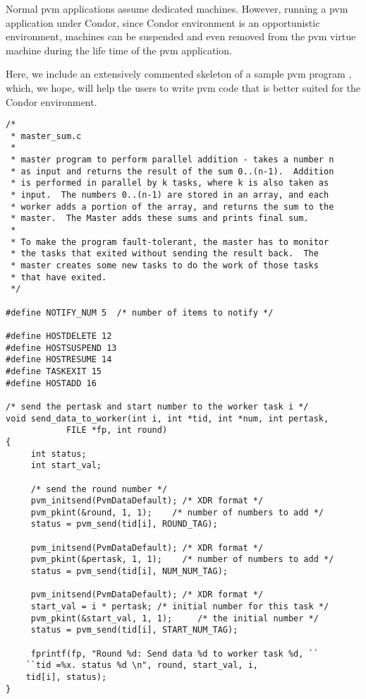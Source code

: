Normal pvm applications assume dedicated machines.  However, running a
pvm application under Condor, since Condor environment is an
opportunistic environment, machines can be suspended and even removed
from the pvm virtue machine during the life time of the pvm
application.  

Here, we include an extensively commented skeleton of a sample pvm
program , which, we hope, will help the users to
write pvm code that is better suited for the Condor environment.

\begin{small}
\begin{verbatim}
/* 
 * master_sum.c
 *
 * master program to perform parallel addition - takes a number n 
 * as input and returns the result of the sum 0..(n-1).  Addition 
 * is performed in parallel by k tasks, where k is also taken as 
 * input.  The numbers 0..(n-1) are stored in an array, and each 
 * worker adds a portion of the array, and returns the sum to the 
 * master.  The Master adds these sums and prints final sum.  
 *
 * To make the program fault-tolerant, the master has to monitor 
 * the tasks that exited without sending the result back.  The 
 * master creates some new tasks to do the work of those tasks 
 * that have exited. 
 */

#define NOTIFY_NUM 5  /* number of items to notify */

#define HOSTDELETE 12
#define HOSTSUSPEND 13
#define HOSTRESUME 14
#define TASKEXIT 15
#define HOSTADD 16
	
/* send the pertask and start number to the worker task i */
void send_data_to_worker(int i, int *tid, int *num, int pertask, 
			FILE *fp, int round)
{
     int status;
     int start_val;
     
     /* send the round number */
     pvm_initsend(PvmDataDefault); /* XDR format */
     pvm_pkint(&round, 1, 1);    /* number of numbers to add */
     status = pvm_send(tid[i], ROUND_TAG);

     pvm_initsend(PvmDataDefault); /* XDR format */
     pvm_pkint(&pertask, 1, 1);    /* number of numbers to add */
     status = pvm_send(tid[i], NUM_NUM_TAG);

     pvm_initsend(PvmDataDefault); /* XDR format */
     start_val = i * pertask; /* initial number for this task */
     pvm_pkint(&start_val, 1, 1);     /* the initial number */
     status = pvm_send(tid[i], START_NUM_TAG);   

     fprintf(fp, "Round %d: Send data %d to worker task %d, ``
	``tid =%x. status %d \n", round, start_val, i, 
	tid[i], status);
}


\end{verbatim}
\end{small}
